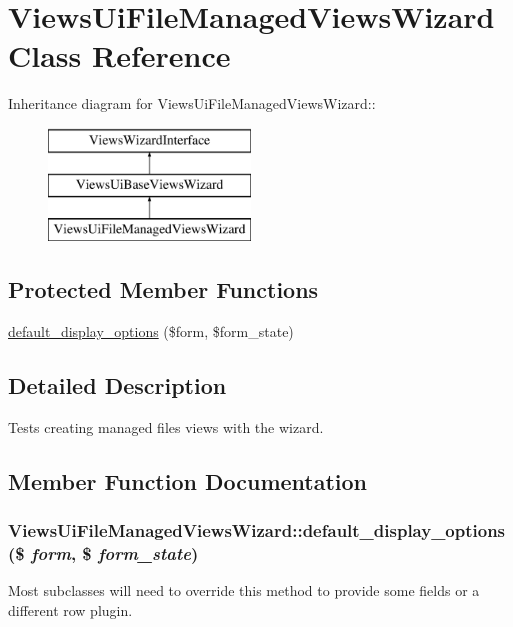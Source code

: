 \hypertarget{classViewsUiFileManagedViewsWizard}{
\section{ViewsUiFileManagedViewsWizard Class Reference}
\label{classViewsUiFileManagedViewsWizard}
}
Inheritance diagram for ViewsUiFileManagedViewsWizard::\begin{figure}[H]
\begin{center}
\leavevmode
\includegraphics[height=3cm]{classViewsUiFileManagedViewsWizard}
\end{center}
\end{figure}
\subsection*{Protected Member Functions}
\begin{DoxyCompactItemize}
\item 
\hyperlink{classViewsUiFileManagedViewsWizard_adfc4a62bbd34d2d231a288cdf6bbfd93}{default\_\-display\_\-options} (\$form, \$form\_\-state)
\end{DoxyCompactItemize}


\subsection{Detailed Description}
Tests creating managed files views with the wizard. 

\subsection{Member Function Documentation}
\hypertarget{classViewsUiFileManagedViewsWizard_adfc4a62bbd34d2d231a288cdf6bbfd93}{
\subsubsection[{default\_\-display\_\-options}]{\setlength{\rightskip}{0pt plus 5cm}ViewsUiFileManagedViewsWizard::default\_\-display\_\-options (\$ {\em form}, \/  \$ {\em form\_\-state})}}
\label{classViewsUiFileManagedViewsWizard_adfc4a62bbd34d2d231a288cdf6bbfd93}
Most subclasses will need to override this method to provide some fields or a different row plugin. 

